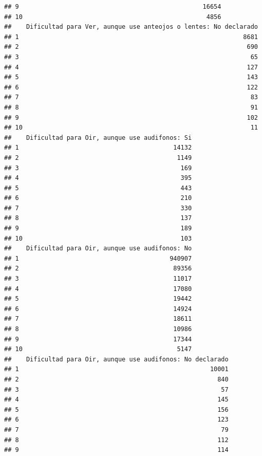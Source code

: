 \documentclass[11pt,]{article}
\begin{document}
\begin{verbatim}
## 9                                                  16654
## 10                                                  4856
##    Dificultad para Ver, aunque use anteojos o lentes: No declarado
## 1                                                             8681
## 2                                                              690
## 3                                                               65
## 4                                                              127
## 5                                                              143
## 6                                                              122
## 7                                                               83
## 8                                                               91
## 9                                                              102
## 10                                                              11
##    Dificultad para Oir, aunque use audifonos: Si
## 1                                          14132
## 2                                           1149
## 3                                            169
## 4                                            395
## 5                                            443
## 6                                            210
## 7                                            330
## 8                                            137
## 9                                            189
## 10                                           103
##    Dificultad para Oir, aunque use audifonos: No
## 1                                         940907
## 2                                          89356
## 3                                          11017
## 4                                          17080
## 5                                          19442
## 6                                          14924
## 7                                          18611
## 8                                          10986
## 9                                          17344
## 10                                          5147
##    Dificultad para Oir, aunque use audifonos: No declarado
## 1                                                    10001
## 2                                                      840
## 3                                                       57
## 4                                                      145
## 5                                                      156
## 6                                                      123
## 7                                                       79
## 8                                                      112
## 9                                                      114

\end{verbatim}
\end{document}
